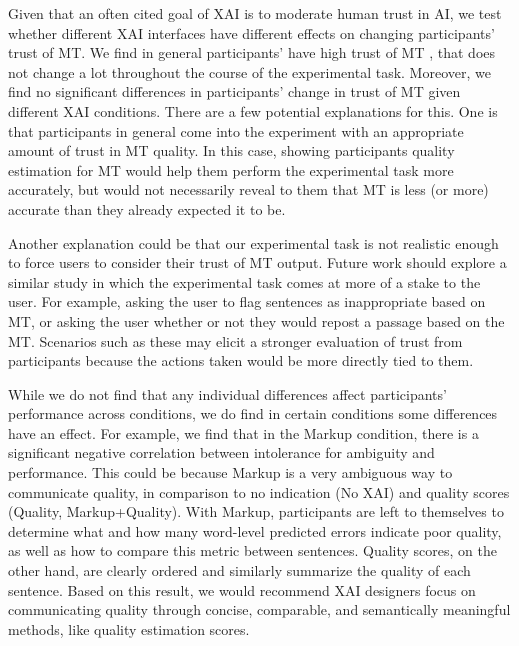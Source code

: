 Given that an often cited goal of XAI is to moderate human trust in AI, we test whether different XAI interfaces have different effects on changing participants’ trust of MT. We find in general participants’ have high trust of MT , that does not change a lot throughout the course of the experimental task. Moreover, we find no significant differences in participants’ change in trust of MT given different XAI conditions. There are a few potential explanations for this. One is that participants in general come into the experiment with an appropriate amount of trust in MT quality. In this case, showing participants quality estimation for MT would help them perform the experimental task more accurately, but would not necessarily reveal to them that MT is less (or more) accurate than they already expected it to be.  

Another explanation could be that our experimental task is not realistic enough to force users to consider their trust of MT output. Future work should explore a similar study in which the experimental task comes at more of a stake to the user. For example, asking the user to flag sentences as inappropriate based on MT, or asking the user whether or not they would repost a passage based on the MT. Scenarios such as these may elicit a stronger evaluation of trust from participants because the actions taken would be more directly tied to them. 

While we do not find that any individual differences affect participants’ performance across conditions, we do find in certain conditions some differences have an effect. For example, we find that in the Markup condition, there is a significant negative correlation between intolerance for ambiguity and performance. This could be because Markup is a very ambiguous way to communicate quality, in comparison to no indication (No XAI) and quality scores (Quality, Markup+Quality). With Markup, participants are left to themselves to determine what and how many word-level predicted errors indicate poor quality, as well as how to compare this metric between sentences. Quality scores, on the other hand, are clearly ordered and similarly summarize the quality of each sentence. Based on this result, we would recommend XAI designers focus on communicating quality through concise, comparable, and semantically meaningful methods, like quality estimation scores. 

